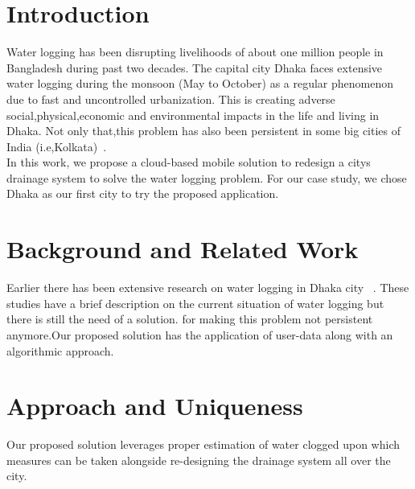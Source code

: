 \documentclass{acm_proc_article-sp}
\begin{document}
\maketitle

\section{Introduction}

Water logging has been disrupting livelihoods of about one million people in Bangladesh during past two decades. The capital city Dhaka faces extensive water logging during the monsoon (May to October) as a regular  phenomenon due to fast and uncontrolled urbanization. This is creating adverse social,physical,economic and environmental impacts in the life and living in Dhaka. Not only that,this problem has also been persistent in some big cities of India (i.e,Kolkata)~\cite{royseasonal}.\\In this work, we propose a cloud-based mobile solution to redesign a city\textquotesingle s drainage system to solve the water logging problem. For our case study, we chose Dhaka as our first city to try the proposed application.

\section{Background and Related Work}

Earlier there has been extensive research on water logging in Dhaka city ~\cite{neelopal2010water}.
These studies have a brief description on the current situation of water logging but there is still the need of a solution. 
for making this problem not persistent anymore.Our proposed solution has the application of user-data along with an algorithmic approach.
% 
\section{Approach and Uniqueness}

 Our proposed solution leverages proper estimation of water clogged upon which measures can be taken alongside re-designing the drainage system all over the city.
\end{document}
